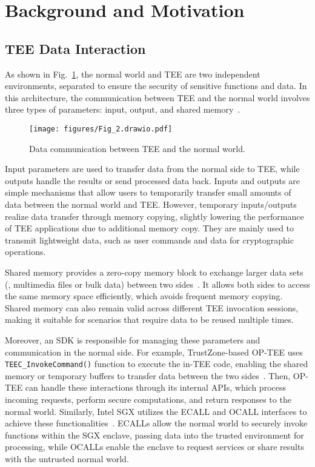 \section{Background and Motivation} \label{s:bg}
\subsection{TEE Data Interaction} \label{s:params}
As shown in Fig.~\ref{fig:datacom}, the normal world and TEE are two independent environments, separated to ensure the security of sensitive functions and data. In this architecture, the communication between TEE and the normal world involves three types of parameters: input, output, and shared memory~\cite{s20041090}.

\begin{figure}[t]
    \centering
    \texttt{[image: figures/Fig\_2.drawio.pdf]}
    \caption{Data communication between TEE and the normal world.}
    \label{fig:datacom}
\end{figure}

Input parameters are used to transfer data from the normal side to TEE, while outputs handle the results or send processed data back. Inputs and outputs are simple mechanisms that allow users to temporarily transfer small amounts of data between the normal world and TEE. However, temporary inputs/outputs realize data transfer through memory copying, slightly lowering the performance of TEE applications due to additional memory copy. They are mainly used to transmit lightweight data, such as user commands and data for cryptographic operations.

Shared memory provides a zero-copy memory block to exchange larger data sets (\eg, multimedia files or bulk data) between two sides~\cite{optee}. It allows both sides to access the same memory space efficiently, which avoids frequent memory copying. Shared memory can also remain valid across different TEE invocation sessions, making it suitable for scenarios that require data to be reused multiple times.

Moreover, an SDK is responsible for managing these parameters and communication in the normal side. For example, TrustZone-based OP-TEE uses \texttt{TEEC\_InvokeCommand()} function to execute the in-TEE code, enabling the shared memory or temporary buffers to transfer data between the two sides~\cite{8684292}. 
Then, OP-TEE can handle these interactions through its internal APIs, which process incoming requests, perform secure computations, and return responses to the normal world.
Similarly, Intel SGX utilizes the ECALL and OCALL interfaces to achieve these functionalities~\cite{10632129}. ECALLs allow the normal world to securely invoke functions within the SGX enclave, passing data into the trusted environment for processing, while OCALLs enable the enclave to request services or share results with the untrusted normal world.

